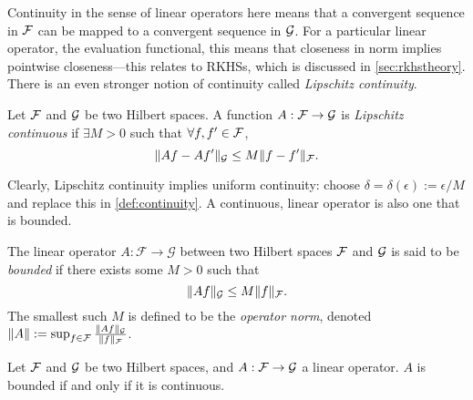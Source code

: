 Continuity in the sense of linear operators here means that a convergent sequence in ${\mathcal F}$ can be mapped to a convergent sequence in ${\mathcal G}$.
For a particular linear operator, the evaluation functional, this means that closeness in norm implies pointwise closeness---this relates to RKHSs, which is discussed in \cref{sec:rkhstheory}.
There is an even stronger notion of continuity called  \emph{Lipschitz continuity}.

\begin{definition}
  Let ${\mathcal F}$ and ${\mathcal G}$ be two Hilbert spaces.  
  A function $A:{\mathcal F}\to{\mathcal G}$ is \emph{Lipschitz continuous} if $\exists M >0$ such that $\forall f,f'\in{\mathcal F}$,
  \[
    \lVert Af - Af'\rVert_{\mathcal G} \leq M \lVert f - f'\rVert_{\mathcal F}.
  \]
\end{definition}

\vspace{-0.8em}
Clearly, Lipschitz continuity implies uniform continuity: choose $\delta = \delta(\epsilon) := \epsilon/M$ and replace this in  \cref{def:continuity}.
A continuous, linear operator is also one that is bounded.

\begin{definition}\label{def:boundedop}
  The linear operator $A:\mathcal F \rightarrow \mathcal G$ between two Hilbert spaces ${\mathcal F}$ and ${\mathcal G}$ is said to be \emph{bounded} if there exists some $M>0$ such that
  \[
    \norm{Af}_\cG \leq M \norm{f}_\cF.\vspace{-0.4em}
  \]
  The smallest such $M$ is defined to be the \emph{operator norm}, denoted $\lVert A\rVert := \sup_{f\in{\mathcal F}} \frac{\lVert Af\rVert_{\mathcal G}}{\lVert f\rVert_{\mathcal F}}$.
\end{definition}

\begin{lemma}\label{thm:boundcont}
  Let ${\mathcal F}$ and ${\mathcal G}$ be two Hilbert spaces, and $A:{\mathcal F}\to{\mathcal G}$ a linear operator.
  $A$ is bounded if and only if it is continuous.
\end{lemma}

